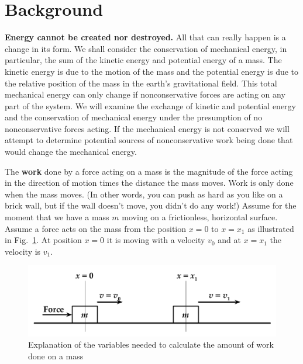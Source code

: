 
\label{lab:M5}

\section{Background}

\textbf{Energy cannot be created nor destroyed.}  All that can really happen is a change in its form. We shall consider the conservation of mechanical energy, in particular, the sum of the kinetic energy and potential energy of a mass.  The kinetic energy is due to the motion of the mass and the potential energy is due to the relative position of the mass in the earth's gravitational field.  This total mechanical energy can only change if nonconservative forces are acting on any part of the system.  We will examine the exchange of kinetic and potential energy and the conservation of mechanical energy under the presumption of no nonconservative forces acting.  If the mechanical energy is not conserved we will attempt to determine potential sources of nonconservative work being done that would change the mechanical energy.





The \textbf{work} done by a force acting on a mass is the magnitude of the force acting in the direction of motion times the distance the mass moves.  Work is only done when the mass moves.  (In other words, you can push as hard as you like on a brick wall, but if the wall doesn't move, you didn't do any work!)  Assume for the moment that we have a mass $m$ moving on a frictionless, horizontal surface.  Assume a force acts on the mass from the position $x = 0$ to $x = x_1$ as illustrated in Fig.~\ref{M05Fig01}.  At position $x = 0$ it is moving with a velocity $v_{0}$ and at $x = x_1$ the velocity is $v_1$.

\begin{figure}
  \begin{center}
    \includegraphics[width=5.0in]{Experiment04Figures/Figure01.pdf}
  \end{center}
  \caption{Explanation of the variables needed to calculate the amount of work done on a mass}
  \label{M05Fig01}  %
\end{figure}

